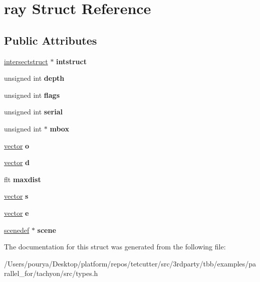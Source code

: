 \hypertarget{structray}{}\section{ray Struct Reference}
\label{structray}
\subsection*{Public Attributes}
\begin{DoxyCompactItemize}
\item 
\hypertarget{structray_a46f02befdfdba160c9ac90debba4c118}{}\hyperlink{structintersectstruct}{intersectstruct} $\ast$ {\bfseries intstruct}\label{structray_a46f02befdfdba160c9ac90debba4c118}

\item 
\hypertarget{structray_a935a0a5036f285ff82f137b9fe869653}{}unsigned int {\bfseries depth}\label{structray_a935a0a5036f285ff82f137b9fe869653}

\item 
\hypertarget{structray_a0d12d809f6ca6990d71ee89a8d4359e3}{}unsigned int {\bfseries flags}\label{structray_a0d12d809f6ca6990d71ee89a8d4359e3}

\item 
\hypertarget{structray_a41213676cc83719d5854ada85ba59ff5}{}unsigned int {\bfseries serial}\label{structray_a41213676cc83719d5854ada85ba59ff5}

\item 
\hypertarget{structray_a96819b34dcc61e10f81ad25f1b8cca19}{}unsigned int $\ast$ {\bfseries mbox}\label{structray_a96819b34dcc61e10f81ad25f1b8cca19}

\item 
\hypertarget{structray_ae5911a1ab9beccb608ad479d3ff60eef}{}\hyperlink{structvector}{vector} {\bfseries o}\label{structray_ae5911a1ab9beccb608ad479d3ff60eef}

\item 
\hypertarget{structray_a33ae5146c8325db83ffdb3feb8e06ae2}{}\hyperlink{structvector}{vector} {\bfseries d}\label{structray_a33ae5146c8325db83ffdb3feb8e06ae2}

\item 
\hypertarget{structray_a81b6d1507fe456e830e8784f544bc8de}{}flt {\bfseries maxdist}\label{structray_a81b6d1507fe456e830e8784f544bc8de}

\item 
\hypertarget{structray_a8119f44e66d2ef56981afa7dbc2a030d}{}\hyperlink{structvector}{vector} {\bfseries s}\label{structray_a8119f44e66d2ef56981afa7dbc2a030d}

\item 
\hypertarget{structray_a7f0d6b4e4c1a35e5b1ae6eec8faaa76e}{}\hyperlink{structvector}{vector} {\bfseries e}\label{structray_a7f0d6b4e4c1a35e5b1ae6eec8faaa76e}

\item 
\hypertarget{structray_ae3b0bad7ac2937560d51ebde3f18f918}{}\hyperlink{structscenedef}{scenedef} $\ast$ {\bfseries scene}\label{structray_ae3b0bad7ac2937560d51ebde3f18f918}

\end{DoxyCompactItemize}


The documentation for this struct was generated from the following file\+:\begin{DoxyCompactItemize}
\item 
/\+Users/pourya/\+Desktop/platform/repos/tetcutter/src/3rdparty/tbb/examples/parallel\+\_\+for/tachyon/src/types.\+h\end{DoxyCompactItemize}
